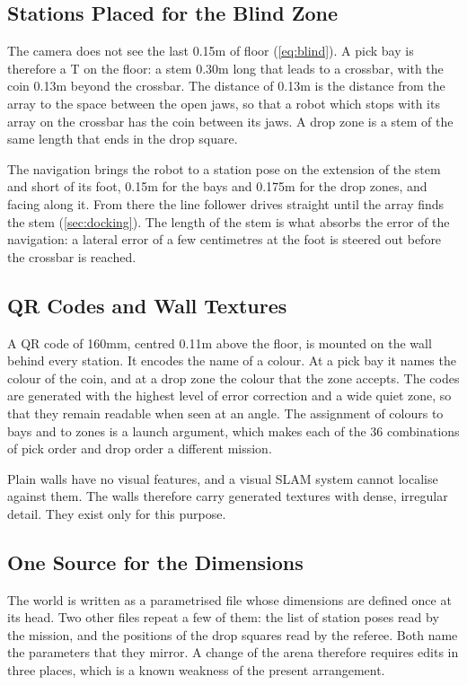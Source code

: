 \subsection{Stations Placed for the Blind Zone}
\label{sec:stations}
The camera does not see the last 0.15\unit{m} of floor (\cref{eq:blind}). A pick bay is
therefore a T on the floor: a stem 0.30\unit{m} long that leads to a crossbar, with the coin
0.13\unit{m} beyond the crossbar. The distance of 0.13\unit{m} is the distance from the
array to the space between the open jaws, so that a robot which stops with its array on the
crossbar has the coin between its jaws. A drop zone is a stem of the same length that ends
in the drop square.

The navigation brings the robot to a station pose on the extension of the stem and short of
its foot, 0.15\unit{m} for the bays and 0.175\unit{m} for the drop zones, and facing along
it. From there the line follower drives straight until the array finds the stem
(\cref{sec:docking}). The length of the stem is what absorbs the error of the navigation: a
lateral error of a few centimetres at the foot is steered out before the crossbar is
reached.

\subsection{QR Codes and Wall Textures}
A QR code of 160\unit{mm}, centred 0.11\unit{m} above the floor, is mounted on the wall
behind every station. It encodes the name of a colour. At a pick bay it names the colour of
the coin, and at a drop zone the colour that the zone accepts. The codes are generated with
the highest level of error correction and a wide quiet zone, so that they remain readable
when seen at an angle. The assignment of colours to bays and to zones is a launch argument,
which makes each of the 36 combinations of pick order and drop order a different mission.

Plain walls have no visual features, and a visual SLAM system cannot localise against them.
The walls therefore carry generated textures with dense, irregular detail. They exist only
for this purpose.

\subsection{One Source for the Dimensions}
The world is written as a parametrised file whose dimensions are defined once at its head.
Two other files repeat a few of them: the list of station poses read by the mission, and
the positions of the drop squares read by the referee. Both name the parameters that they
mirror. A change of the arena therefore requires edits in three places, which is a known
weakness of the present arrangement.
